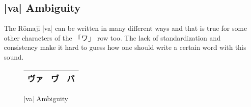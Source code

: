 \subsection{|va|  Ambiguity} \label{subsec:VaAmbiguity}

The Rōmaji |va| can be written in many different ways and that is true for some
other characters of the {「ワ」} row too. The lack of standardization and
consistency make it hard to guess how one should write a certain word with this
sound.

\bigskip

\begin{figure}[H]
\begin{center}
\Huge
\begin{tabular}{|c|c|c|}\hline
ヴァ&ヷ&バ\\\hline
\end{tabular}
\end{center}
\caption{|va|  Ambiguity}
\label{fig:VaAmbiguity}
\end{figure}

